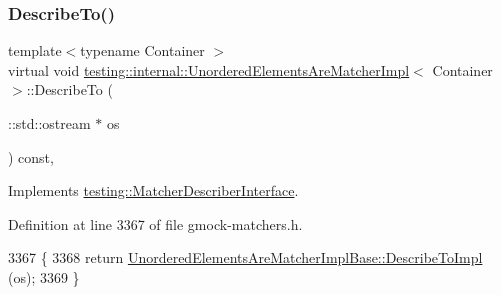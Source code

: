 \subsubsection{\texorpdfstring{Describe\+To()}{DescribeTo()}}
{\footnotesize\ttfamily template$<$typename Container $>$ \\
virtual void \hyperlink{classtesting_1_1internal_1_1UnorderedElementsAreMatcherImpl}{testing\+::internal\+::\+Unordered\+Elements\+Are\+Matcher\+Impl}$<$ Container $>$\+::Describe\+To (\begin{DoxyParamCaption}\item[{\+::std\+::ostream $\ast$}]{os }\end{DoxyParamCaption}) const\hspace{0.3cm}{\ttfamily [inline]}, {\ttfamily [virtual]}}



Implements \hyperlink{classtesting_1_1MatcherDescriberInterface_ad9f861588bd969b6e3e717f13bb94e7b}{testing\+::\+Matcher\+Describer\+Interface}.



Definition at line 3367 of file gmock-\/matchers.\+h.


\begin{DoxyCode}
3367                                                 \{
3368     \textcolor{keywordflow}{return} \hyperlink{classtesting_1_1internal_1_1UnorderedElementsAreMatcherImplBase_a40318adf9a89d830a26a96b2eb06b4e3}{UnorderedElementsAreMatcherImplBase::DescribeToImpl}
      (os);
3369   \}
\end{DoxyCode}
\mbox{\label{classtesting_1_1internal_1_1UnorderedElementsAreMatcherImpl_a239a646747dc155e8cd69903cd1e0286}} 
